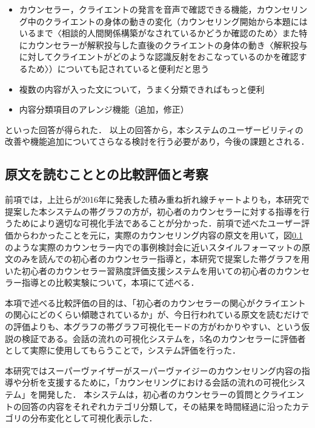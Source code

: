 \documentclass[shuuron]{kuee}
\begin{document}
\begin{itemize}

  \item カウンセラー，クライエントの発言を音声で確認できる機能，カウンセリング中のクライエントの身体の動きの変化（カウンセリング開始から本題にはいるまで〈相談的人間関係構築がなされているかどうか確認のため〉また特にカウンセラーが解釈投与した直後のクライエントの身体の動き〈解釈投与に対してクライエントがどのような認識反射をおこなっているのかを確認するため〉）についても記されていると便利だと思う
  \item 複数の内容が入った文について，うまく分類できればもっと便利
  \item 内容分類項目のアレンジ機能（追加，修正）
\end{itemize}
といった回答が得られた．
以上の回答から，本システムのユーザービリティの改善や機能追加についてさらなる検討を行う必要があり，今後の課題とされる．



\subsection{原文を読むこととの比較評価と考察}%


前項では，上辻ら\cite{uetsuji}が2016年に発表した積み重ね折れ線チャートよりも，本研究で提案した本システムの帯グラフの方が，初心者のカウンセラーに対する指導を行うためにより適切な可視化手法であることが分かった．前項で述べたユーザー評価からわかったことを元に，実際のカウンセリング内容の原文を用いて，図\ref{}のような実際のカウンセラー内での事例検討会に近いスタイルフォーマットの原文のみを読んでの初心者のカウンセラー指導と，本研究で提案した帯グラフを用いた初心者のカウンセラー習熟度評価支援システムを用いての初心者のカウンセラー指導との比較実験について，本項にて述べる．

本項で述べる比較評価の目的は、「初心者のカウンセラーの関心がクライエントの関心にどのくらい傾聴されているか」が、今日行われている原文を読むだけでの評価よりも、本グラフの帯グラフ可視化モードの方がわかりやすい、という仮説の検証である。会話の流れの可視化システムを，5名のカウンセラーに評価者として実際に使用してもらうことで，システム評価を行った．

本研究ではスーパーヴァイザーがスーパーヴァイジーのカウンセリング内容の指導や分析を支援するために，「カウンセリングにおける会話の流れの可視化システム」を開発した．
本システムは，初心者のカウンセラーの質問とクライエントの回答の内容をそれぞれカテゴリ分類して，その結果を時間経過に沿ったカテゴリの分布変化として可視化表示した．
\end{document}
